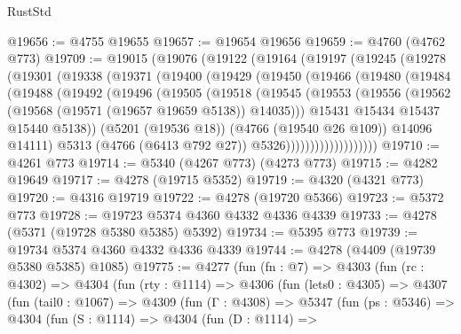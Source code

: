\begin{lexlean}{RustStd}
\begin{coremodule}
{\begin{coremodule}
{{{{{{{{{{{{{{{{{{{{{{{{{{{{{{{{{{{@19656 := @4755 @19655
@19657 := @19654 @19656
@19659 := @4760 (@4762 @773)
@19709 := @19015
    (@19076
      (@19122
        (@19164
          (@19197
            (@19245
              (@19278
                (@19301
                  (@19338
                    (@19371
                      (@19400
                        (@19429
                          (@19450
                            (@19466
                              (@19480
                                (@19484
                                  (@19488
                                    (@19492
                                      (@19496
                                        (@19505
                                          (@19518
                                            (@19545
                                              (@19553
                                                (@19556
                                                  (@19562
                                                    (@19568 (@19571 (@19657 @19659 @5138)) @14035)))
                                                @15431
                                                @15434
                                                @15437
                                                @15440
                                                @5138))
                                            (@5201 (@19536 @18))
                                            (@4766 (@19540 @26 @109))
                                            @14096
                                            @14111)
                                          @5313
                                          (@4766 (@6413 @792 @27))
                                          @5326)))))))))))))))))))
@19710 := @4261 @773
@19714 := @5340 (@4267 @773) (@4273 @773)
@19715 := @4282 @19649
@19717 := @4278 (@19715 @5352)
@19719 := @4320 (@4321 @773)
@19720 := @4316 @19719
@19722 := @4278 (@19720 @5366)
@19723 := @5372 @773
@19728 := @19723 @5374 @4360 @4332 @4336 @4339
@19733 := @4278 (@5371 (@19728 @5380 @5385) @5392)
@19734 := @5395 @773
@19739 := @19734 @5374 @4360 @4332 @4336 @4339
@19744 := @4278 (@4409 (@19739 @5380 @5385) @1085)
@19775 := @4277
    (fun (fn : @7) =>
    @4303
      (fun (rc : @4302) =>
      @4304
        (fun (rty : @1114) =>
        @4306
          (fun (lets0 : @4305) =>
          @4307
            (fun (tail0 : @1067) =>
            @4309
              (fun (Γ : @4308) =>
              @5347
                (fun (ps : @5346) =>
                @4304
                  (fun (S : @1114) =>
                  @4304
                    (fun (D : @1114) =>
}}}}}}}}}}}}}}}}}}}}}}}}}}}}}}}}}}}
\end{coremodule}}
\end{coremodule}
\end{lexlean}
